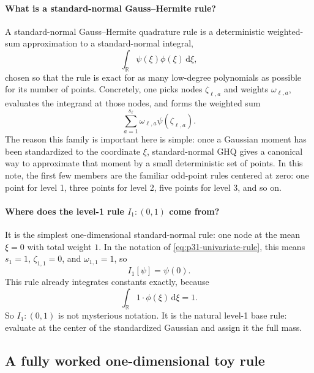 \documentclass[11pt]{article}
\numberwithin{equation}{section}
\newcommand{\R}{\mathbb R}
\newcommand{\dd}{\,\mathrm d}
\begin{document}
\paragraph{What is a standard-normal Gauss--Hermite rule?}
A standard-normal Gauss--Hermite quadrature rule is a deterministic weighted-sum
approximation to a standard-normal integral,
\[
  \int_{\R}\psi(\xi)\phi(\xi)\dd\xi,
\]
chosen so that the rule is exact for as many low-degree polynomials as possible
for its number of points.  Concretely, one picks nodes
\(\zeta_{\ell,a}\) and weights \(\omega_{\ell,a}\), evaluates the integrand at
those nodes, and forms the weighted sum
\[
  \sum_{a=1}^{s_\ell}\omega_{\ell,a}\psi(\zeta_{\ell,a}).
\]
The reason this family is important here is simple: once a Gaussian moment has
been standardized to the coordinate \(\xi\), standard-normal GHQ gives a canonical
way to approximate that moment by a small deterministic set of points.  In this
note, the first few members are the familiar odd-point rules centered at zero:
one point for level 1, three points for level 2, five points for level 3, and so
on.

\paragraph{Where does the level-1 rule \texorpdfstring{\(I_1:(0,1)\)}{I1:(0,1)} come from?}
It is the simplest one-dimensional standard-normal rule: one node at the mean
\(\xi=0\) with total weight \(1\).  In the notation of
\eqref{eq:p31-univariate-rule}, this means \(s_1=1\),
\(\zeta_{1,1}=0\), and \(\omega_{1,1}=1\), so
\[
  I_1[\psi]=\psi(0).
\]
This rule already integrates constants exactly, because
\[
  \int_{\R}1\cdot\phi(\xi)\dd\xi=1.
\]
So \(I_1:(0,1)\) is not mysterious notation.  It is the natural level-1 base
rule: evaluate at the center of the standardized Gaussian and assign it the full
mass.

\subsection{A fully worked one-dimensional toy rule}
\end{document}
